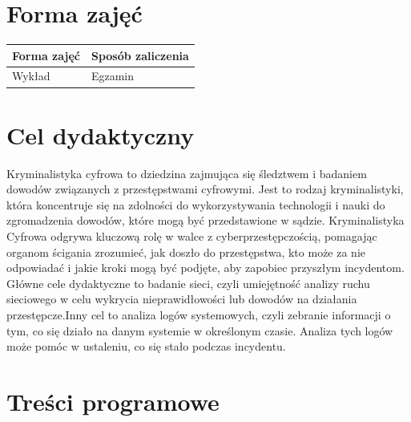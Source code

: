 \documentclass[12pt, a4paper]{article}
\begin{document}
\section{Forma zajęć}

\begin{tabular}{ll}
  \hline
  \textbf{Forma zajęć} & \textbf{Sposób zaliczenia} \\
  \hline
  Wykład & Egzamin \\
  \hline
\end{tabular}

\section{Cel dydaktyczny}

Kryminalistyka cyfrowa to dziedzina zajmująca się śledztwem i badaniem dowodów związanych z przestępstwami cyfrowymi. Jest to rodzaj kryminalistyki, która koncentruje się na zdolności do wykorzystywania technologii i nauki do zgromadzenia dowodów, które mogą być przedstawione w sądzie. Kryminalistyka Cyfrowa odgrywa kluczową rolę w walce z cyberprzestępczością, pomagając organom ścigania zrozumieć, jak doszło do przestępstwa, kto może za nie odpowiadać i jakie kroki mogą być podjęte, aby zapobiec przyszłym incydentom. Główne cele dydaktyczne to badanie sieci, czyli umiejętność analizy ruchu sieciowego w celu wykrycia nieprawidłowości lub dowodów na działania przestępcze.Inny cel to analiza logów systemowych, czyli zebranie informacji o tym, co się działo na danym systemie w określonym czasie. Analiza tych logów może pomóc w ustaleniu, co się stało podczas incydentu.

\section{Treści programowe}
\end{document}

